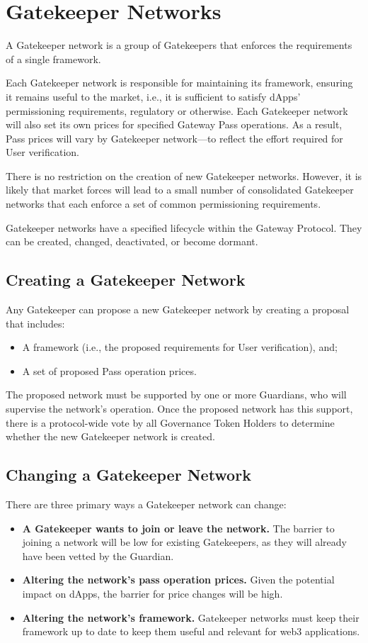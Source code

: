 \section{Gatekeeper Networks}\label{sec:networks}
A Gatekeeper network is a group of Gatekeepers that enforces the requirements of a single framework.

Each Gatekeeper network is responsible for maintaining its framework, ensuring it remains useful to the market, i.e., it is sufficient to satisfy dApps’ permissioning requirements, regulatory or otherwise. Each Gatekeeper network will also set its own prices for specified Gateway Pass operations. As a result, Pass prices will vary by Gatekeeper network—to reflect the effort required for User verification.

There is no restriction on the creation of new Gatekeeper networks. However, it is likely that market forces will lead to a small number of consolidated Gatekeeper networks that each enforce a set of common permissioning requirements.

Gatekeeper networks have a specified lifecycle within the Gateway Protocol. They can be created, changed, deactivated, or become dormant.

\subsection{Creating a Gatekeeper Network}
Any Gatekeeper can propose a new Gatekeeper network by creating a proposal that includes:

\begin{itemize}
\item A framework (i.e., the proposed requirements for User verification), and;
\item A set of proposed Pass operation prices.
\end{itemize}

The proposed network must be supported by one or more Guardians, who will supervise the network’s operation. Once the proposed network has this support, there is a protocol-wide vote by all Governance Token Holders to determine whether the new Gatekeeper network is created.

\subsection{Changing a Gatekeeper Network}
There are three primary ways a Gatekeeper network can change:

\begin{itemize}
\item \textbf{A Gatekeeper wants to join or leave the network.} The barrier to joining a network will be low for existing Gatekeepers, as they will already have been vetted by the Guardian.
\item \textbf{Altering the network’s pass operation prices.} Given the potential impact on dApps, the barrier for price changes will be high.
\item \textbf{Altering the network’s framework.} Gatekeeper networks must keep their framework up to date to keep them useful and relevant for web3 applications.
\end{itemize}

